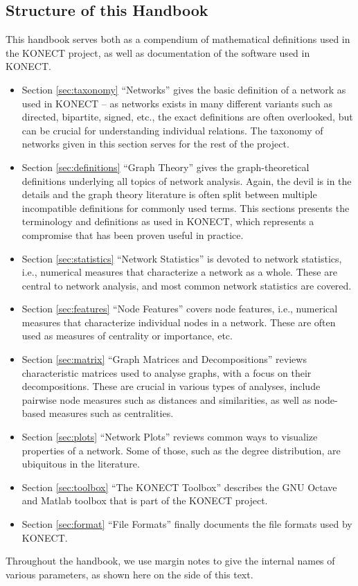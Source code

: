 \documentclass{article}
\begin{document}
\subsection{Structure of this Handbook}
This handbook serves both as a compendium of mathematical definitions
used in the KONECT project, as well as documentation of the software
used in KONECT. 
\begin{itemize}
\item Section \ref{sec:taxonomy} ``Networks'' gives the basic
  definition of a network as used in KONECT -- as networks exists in
  many different variants such as directed, bipartite, signed, etc., the
  exact definitions are often overlooked, but can be crucial for
  understanding individual relations. The taxonomy of networks given in
  this section serves for the rest of the project. 
\item Section \ref{sec:definitions} ``Graph Theory'' gives the
  graph-theoretical definitions underlying all topics of network analysis.  Again,
  the devil is in the details and the graph theory literature is often
  split between multiple incompatible definitions for commonly used
  terms.  This sections presents the terminology and definitions as used
  in KONECT, which represents a compromise that has been proven useful
  in practice. 
\item Section \ref{sec:statistics} ``Network Statistics'' is devoted to
  network statistics, i.e., numerical measures that characterize a
  network as a whole.  These are central to network analysis, and most
  common network statistics are covered. 
\item Section \ref{sec:features} ``Node Features'' covers node features,
  i.e., numerical measures that characterize individual nodes in a
  network.  These are often used as measures of centrality or
  importance, etc. 
\item Section \ref{sec:matrix} ``Graph Matrices and Decompositions'' reviews
  characteristic matrices used to analyse graphs, with a focus on their
  decompositions.  These are crucial in various types of analyses,
  include pairwise node measures such as distances and similarities, as
  well as node-based measures such as centralities. 
\item Section \ref{sec:plots} ``Network Plots'' reviews common ways to
  visualize properties of a network.  Some of those, such as the degree
  distribution, are ubiquitous in the literature. 
\item Section \ref{sec:toolbox} ``The KONECT Toolbox'' describes the GNU
  Octave and Matlab toolbox that is part of the KONECT project. 
\item Section \ref{sec:format} ``File Formats'' finally documents the
  file formats used by KONECT. 
\end{itemize}
Throughout the handbook, we use margin notes to give the internal 
names of various parameters, as shown here on the side of this text.  
\end{document}
